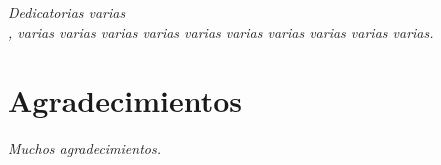 
\thispagestyle{empty}
\vspace*{4cm}
\begin{flushright}           %
\textit{Dedicatorias varias \\,   
varias varias varias varias varias varias varias varias varias varias.}
\end{flushright}




\cleardoublepage
\chapter*{Agradecimientos}  %


\vspace{10mm}
\textit{Muchos agradecimientos.}

